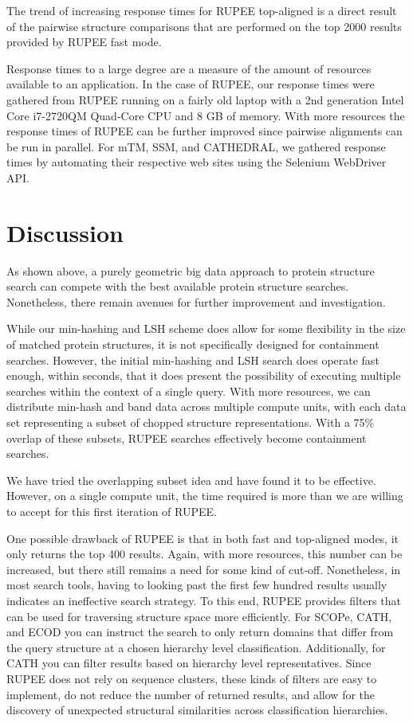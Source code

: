 \documentclass[10pt,letterpaper]{article}
\begin{document}
The trend of increasing response times for RUPEE top-aligned is a direct result of the pairwise structure comparisons that are performed on the top 2000 results provided by RUPEE fast mode.

Response times to a large degree are a measure of the amount of resources available to an application. 
In the case of RUPEE, our response times were gathered from RUPEE running on a fairly old laptop with a 2nd generation Intel\textregistered{} Core\texttrademark{} i7-2720QM Quad-Core CPU and 8 GB of memory. 
With more resources the response times of RUPEE can be further improved since pairwise alignments can be run in parallel. 
For mTM, SSM, and CATHEDRAL, we gathered response times by automating their respective web sites using the Selenium WebDriver API. 

\section*{Discussion}

As shown above, a purely geometric big data approach to protein structure search can compete with the best available protein structure searches.
Nonetheless, there remain avenues for further improvement and investigation. 

While our min-hashing and LSH scheme does allow for some flexibility in the size of matched protein structures, it is not specifically designed for containment searches. 
However, the initial min-hashing and LSH search does operate fast enough, within seconds, that it does present the possibility of executing multiple searches within the context of a single query. 
With more resources, we can distribute min-hash and band data across multiple compute units, with each data set representing a subset of chopped structure representations. 
With a 75\% overlap of these subsets, RUPEE searches effectively become containment searches. 

We have tried the overlapping subset idea and have found it to be effective. 
However, on a single compute unit, the time required is more than we are willing to accept for this first iteration of RUPEE. 

One possible drawback of RUPEE is that in both fast and top-aligned modes, it only returns the top 400 results. 
Again, with more resources, this number can be increased, but there still remains a need for some kind of cut-off. 
Nonetheless, in most search tools, having to looking past the first few hundred results usually indicates an ineffective search strategy.
To this end, RUPEE provides filters that can be used for traversing structure space more efficiently. 
For SCOPe, CATH, and ECOD you can instruct the search to only return domains that differ from the query structure at a chosen hierarchy level classification. 
Additionally, for CATH you can filter results based on hierarchy level representatives. 
Since RUPEE does not rely on sequence clusters, these kinds of filters are easy to implement, do not reduce the number of returned results, and allow for the discovery of unexpected structural similarities across classification hierarchies.  
\end{document}
